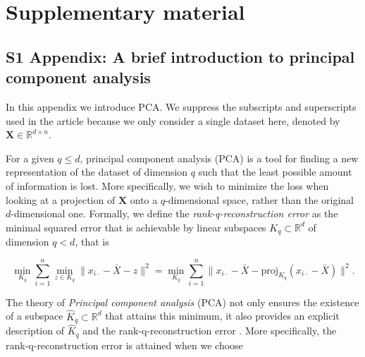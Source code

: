 \documentclass[a4paper,12pt]{article}
\newcommand{\RR}{\mathbb{R}}
\begin{document}
\newpage

\section*{Supplementary material}


\subsection*{S1 Appendix: A brief introduction to principal component analysis}
\label{appendix.introPCA}

In this appendix we introduce PCA. We suppress the subscripts and superscripts used in the article because we only consider a single dataset here, denoted by $\mathbf{X} \in \RR^{d \times n}$. 

For a given $q \leq d$, principal component analysis (PCA) is a tool for finding a new representation of the dataset of dimension $q$ such that the least possible amount of information is lost. More specifically, we wish to minimize the loss when looking at a projection of $\mathbf{X}$ onto a $q$-dimensional space, rather than the original $d$-dimensional one. Formally, we define the \emph{rank-q-reconstruction error} as the minimal squared error that is achievable by linear subspaces $K_q \subset \RR^d$ of dimension $q < d$, that is

\begin{equation}
\min_{K_q} \sum_{i=1}^n \min_{z \in K_q} \lVert x_{i \cdot} - \bar{X} - z \rVert^2 =
\min_{K_q} \sum_{i=1}^n \lVert x_{i \cdot} - \bar{X} - \text{proj}_{K_q}(x_{i \cdot} - \bar{X}) \rVert^2.
\end{equation}

The theory of \emph{Principal component analysis} (PCA) not only ensures the existence of a subspace $\hat{K}_q \subset \RR^d$ that attains this minimum, it also provides an explicit description of $\hat{K}_q$ and the rank-q-reconstruction error \cite{HastieEtAl2009}. More specifically, the rank-q-reconstruction error is attained when we choose
\end{document}
